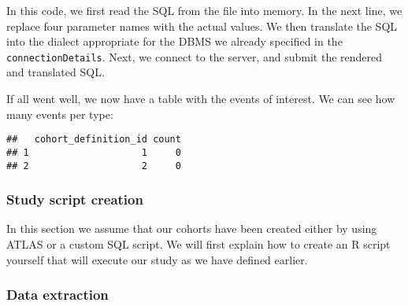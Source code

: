 \documentclass[
]{article}
\newenvironment{Shaded}{\begin{snugshade}}{\end{snugshade}}
\newcommand{\AttributeTok}[1]{\textcolor[rgb]{0.13,0.29,0.53}{#1}}
\newcommand{\FunctionTok}[1]{\textcolor[rgb]{0.13,0.29,0.53}{\textbf{#1}}}
\newcommand{\NormalTok}[1]{#1}
\newcommand{\OtherTok}[1]{\textcolor[rgb]{0.56,0.35,0.01}{#1}}
\newcommand{\SpecialCharTok}[1]{\textcolor[rgb]{0.81,0.36,0.00}{\textbf{#1}}}
\newcommand{\StringTok}[1]{\textcolor[rgb]{0.31,0.60,0.02}{#1}}
\begin{document}
In this code, we first read the SQL from the file into memory. In the
next line, we replace four parameter names with the actual values. We
then translate the SQL into the dialect appropriate for the DBMS we
already specified in the \texttt{connectionDetails}. Next, we connect to
the server, and submit the rendered and translated SQL.

If all went well, we now have a table with the events of interest. We
can see how many events per type:

\begin{Shaded}
\end{Shaded}

\begin{verbatim}
##   cohort_definition_id count
## 1                    1     0
## 2                    2     0
\end{verbatim}

\hypertarget{study-script-creation-1}{%
\subsubsection{Study script creation}\label{study-script-creation-1}}

In this section we assume that our cohorts have been created either by
using ATLAS or a custom SQL script. We will first explain how to create
an R script yourself that will execute our study as we have defined
earlier.

\hypertarget{data-extraction-1}{%
\subsubsection{Data extraction}\label{data-extraction-1}}
\end{document}

